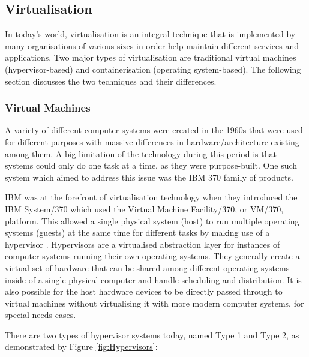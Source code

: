 
\subsection{Virtualisation}
In today's world, virtualisation is an integral technique that is implemented by many organisations of various sizes in order help maintain different services and applications. Two major types of virtualisation are traditional virtual machines (hypervisor-based) and containerisation (operating system-based). The following section discusses the two techniques and their differences.

\subsubsection{Virtual Machines}
 
A variety of different computer systems were created in the 1960s that were used for different purposes with massive differences in hardware/architecture existing among them. A big limitation of the technology during this period is that systems could only do one task at a time, as they were purpose-built. One such system which aimed to address this issue was the IBM 370 family of products.

IBM was at the forefront of virtualisation technology when they introduced the IBM System/370 which used the Virtual Machine Facility/370, or VM/370, platform. This allowed a single physical system (host) to run multiple operating systems (guests) at the same time for different tasks by making use of a hypervisor \parencite{creasy1981origin}. Hypervisors are a virtualised abstraction layer for instances of computer systems running their own operating systems. They generally create a virtual set of hardware that can be shared among different operating systems inside of a single physical computer and handle scheduling and distribution. It is also possible for the host hardware devices to be directly passed through to virtual machines without virtualising it with more modern computer systems, for special needs cases.

There are two types of hypervisor systems today, named Type 1 and Type 2, as demonstrated by Figure \ref{fig:Hypervisors}:


